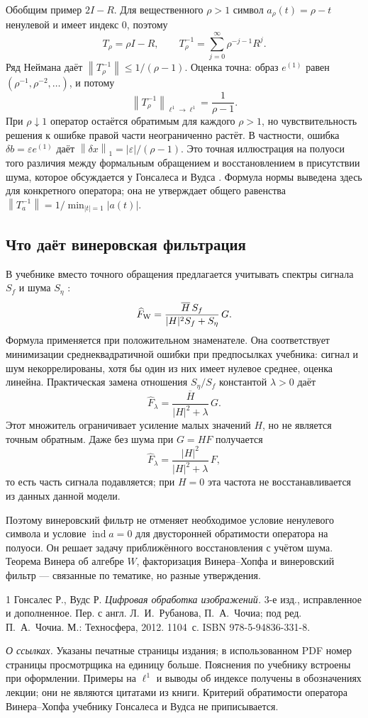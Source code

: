 \documentclass[12pt,a4paper]{article}
\theoremstyle{definition}
\theoremstyle{remark}
\newcommand{\eps}{\varepsilon}
\newcommand{\norm}[1]{\left\lVert #1\right\rVert}
\DeclareMathOperator{\ind}{ind}
\begin{document}
Обобщим пример $2I-R$. Для вещественного $\rho>1$ символ
$a_\rho(t)=\rho-t$ ненулевой и имеет индекс $0$, поэтому
\[
  T_\rho=\rho I-R,\qquad
  T_\rho^{-1}=\sum_{j=0}^{\infty}\rho^{-j-1}R^j.
\]
Ряд Неймана даёт $\norm{T_\rho^{-1}}\leqslant1/(\rho-1)$.
Оценка точна: образ $e^{(1)}$ равен
$(\rho^{-1},\rho^{-2},\ldots)$, и потому
\[
  \boxed{\norm{T_\rho^{-1}}_{\ell^1\to\ell^1}
    =\frac1{\rho-1}}.
\]
При $\rho\downarrow1$ оператор остаётся обратимым для каждого
$\rho>1$, но чувствительность решения к ошибке правой части
неограниченно растёт. В частности, ошибка
$\delta b=\eps e^{(1)}$ даёт
$\norm{\delta x}_1=|\eps|/(\rho-1)$.
Это точная иллюстрация на полуоси того различия между
формальным обращением и восстановлением в присутствии шума,
которое обсуждается у Гонсалеса и Вудса
\cite[\S\,5.7, с.~411--414]{GW2012}.
Формула нормы выведена здесь для конкретного оператора;
она не утверждает общего равенства
$\norm{T_a^{-1}}=1/\min_{|t|=1}|a(t)|$.

\subsection{Что даёт винеровская фильтрация}

В учебнике вместо точного обращения предлагается учитывать
спектры сигнала $S_f$ и шума $S_\eta$
\cite[\S\,5.8, с.~414--416]{GW2012}:
\[
  \widehat F_{\rm W}
  =\frac{\overline H\,S_f}{|H|^2S_f+S_\eta}\,G.
\]
Формула применяется при положительном знаменателе.
Она соответствует минимизации среднеквадратичной ошибки
при предпосылках учебника: сигнал и шум некоррелированы,
хотя бы один из них имеет нулевое среднее, оценка линейна.
Практическая замена отношения $S_\eta/S_f$ константой
$\lambda>0$ даёт
\[
  \widehat F_\lambda=\frac{\overline H}{|H|^2+\lambda}\,G.
\]
Этот множитель ограничивает усиление малых значений $H$,
но не является точным обратным. Даже без шума при $G=HF$
получается
\[
  \widehat F_\lambda
  =\frac{|H|^2}{|H|^2+\lambda}\,F,
\]
то есть часть сигнала подавляется; при $H=0$ эта частота
не восстанавливается из данных данной модели.

Поэтому винеровский фильтр не отменяет необходимое условие
ненулевого символа и условие $\ind a=0$ для двусторонней обратимости
оператора на полуоси. Он решает задачу приближённого восстановления
с учётом шума. Теорема Винера об алгебре $W$, факторизация
Винера--Хопфа и винеровский фильтр --- связанные по тематике,
но разные утверждения.

\begin{thebibliography}{1}
Гонсалес Р., Вудс Р.
\emph{Цифровая обработка изображений.}
3-е изд., исправленное и дополненное.
Пер. с англ. Л.~И.~Рубанова, П.~А.~Чочиа;
под ред. П.~А.~Чочиа. М.: Техносфера, 2012. 1104~с.
ISBN 978-5-94836-331-8.
\end{thebibliography}

\noindent\emph{О ссылках.} Указаны печатные страницы издания;
в использованном PDF номер страницы просмотрщика на единицу больше.
Пояснения по учебнику встроены при оформлении. Примеры на $\ell^1$
и выводы об индексе получены в обозначениях лекции; они не являются
цитатами из книги. Критерий обратимости оператора Винера--Хопфа
учебнику Гонсалеса и Вудса не приписывается.
\end{document}
